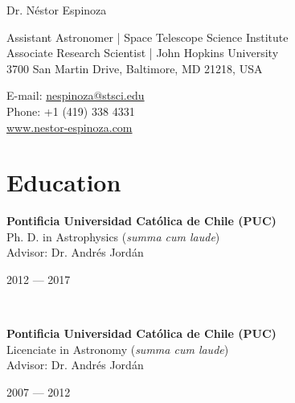 \documentclass[12pt, a4paper]{article} %
\begin{document}

{\LARGE Dr. N\'estor Espinoza}\\[0.2cm] %
\begin{minipage}[t]{0.63\textwidth}
Assistant Astronomer | Space Telescope Science Institute\\
Associate Research Scientist | John Hopkins University\\
3700 San Martin Drive, Baltimore, MD 21218, USA \\
\end{minipage}
\begin{minipage}[t]{0.37\textwidth}
E-mail: \href{mailto:nespinoza@stsci.edu}{nespinoza@stsci.edu}\\
Phone: +1 (419) 338 4331\\ 
\url{www.nestor-espinoza.com}
\end{minipage}

\hrulefill
\section*{Education}


\begin{minipage}[t]{0.6\textwidth}
\begin{flushleft}%
  \setlength{\leftskip}{0.2cm}%
\textbf{Pontificia Universidad Cat\'olica de Chile (PUC)}\\
Ph. D. in Astrophysics (\textit{summa cum laude})\\
Advisor: Dr. Andr\'es Jord\'an
 
\end{flushleft}
\end{minipage}
\begin{minipage}[t]{0.4\textwidth}
\hfill 2012 --- 2017 
\end{minipage}\\

\begin{minipage}[t]{0.6\textwidth}
\begin{flushleft}%
  \setlength{\leftskip}{0.2cm}%
\textbf{Pontificia Universidad Cat\'olica de Chile (PUC)}\\
 Licenciate in Astronomy (\textit{summa cum laude})\\
 Advisor: Dr. Andr\'es Jord\'an
 \end{flushleft}
\end{minipage}
\begin{minipage}[t]{0.4\textwidth}
\hfill 2007 --- 2012 
\end{minipage}
\end{document}
